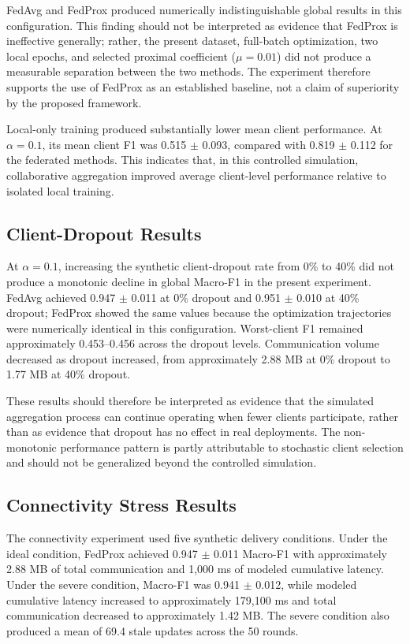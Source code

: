 FedAvg and FedProx produced numerically indistinguishable global results in this configuration. This finding should not be interpreted as evidence that FedProx is ineffective generally; rather, the present dataset, full-batch optimization, two local epochs, and selected proximal coefficient ($\mu=0.01$) did not produce a measurable separation between the two methods. The experiment therefore supports the use of FedProx as an established baseline, not a claim of superiority by the proposed framework.

Local-only training produced substantially lower mean client performance. At $\alpha=0.1$, its mean client F1 was 0.515 $\pm$ 0.093, compared with 0.819 $\pm$ 0.112 for the federated methods. This indicates that, in this controlled simulation, collaborative aggregation improved average client-level performance relative to isolated local training.

\subsection{Client-Dropout Results}
At $\alpha=0.1$, increasing the synthetic client-dropout rate from 0\% to 40\% did not produce a monotonic decline in global Macro-F1 in the present experiment. FedAvg achieved 0.947 $\pm$ 0.011 at 0\% dropout and 0.951 $\pm$ 0.010 at 40\% dropout; FedProx showed the same values because the optimization trajectories were numerically identical in this configuration. Worst-client F1 remained approximately 0.453--0.456 across the dropout levels. Communication volume decreased as dropout increased, from approximately 2.88 MB at 0\% dropout to 1.77 MB at 40\% dropout.

These results should therefore be interpreted as evidence that the simulated aggregation process can continue operating when fewer clients participate, rather than as evidence that dropout has no effect in real deployments. The non-monotonic performance pattern is partly attributable to stochastic client selection and should not be generalized beyond the controlled simulation.

\subsection{Connectivity Stress Results}
The connectivity experiment used five synthetic delivery conditions. Under the ideal condition, FedProx achieved 0.947 $\pm$ 0.011 Macro-F1 with approximately 2.88 MB of total communication and 1,000 ms of modeled cumulative latency. Under the severe condition, Macro-F1 was 0.941 $\pm$ 0.012, while modeled cumulative latency increased to approximately 179,100 ms and total communication decreased to approximately 1.42 MB. The severe condition also produced a mean of 69.4 stale updates across the 50 rounds.

